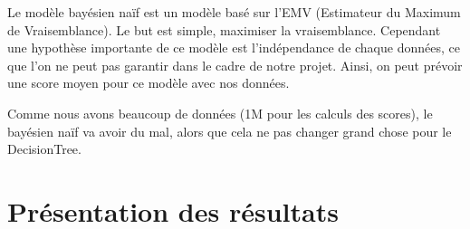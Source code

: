 \documentclass{article}
\begin{document}
    Le modèle bayésien naïf est un modèle basé sur l'EMV
    (Estimateur du Maximum de Vraisemblance).
    Le but est simple, maximiser la vraisemblance. 
    Cependant une hypothèse importante de ce modèle est l'indépendance de chaque données,
    ce que l'on ne peut pas garantir dans le cadre de notre projet.
    Ainsi, on peut prévoir une score moyen pour ce modèle avec nos données.

    Comme nous avons beaucoup de données (1M pour les calculs des scores),
    le bayésien naïf va avoir du mal, alors que cela ne pas changer grand
    chose pour le DecisionTree.

    \section{Présentation des résultats}
\end{document}
